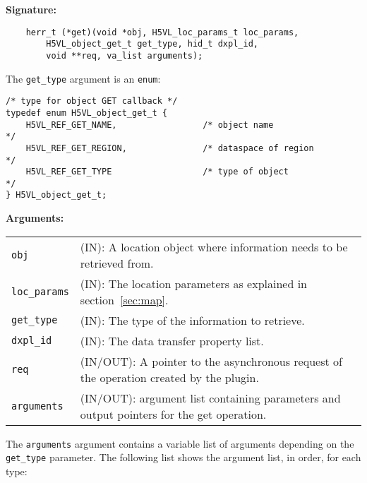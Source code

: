 \begin{mdframed}[style=bgbox]
\textbf{Signature:}
\begin{lstlisting}
    herr_t (*get)(void *obj, H5VL_loc_params_t loc_params, 
        H5VL_object_get_t get_type, hid_t dxpl_id, 
        void **req, va_list arguments);
\end{lstlisting}

The \texttt{get\_type} argument is an \texttt{enum}:
\begin{lstlisting}
/* type for object GET callback */
typedef enum H5VL_object_get_t {
    H5VL_REF_GET_NAME,                 /* object name                       */
    H5VL_REF_GET_REGION,               /* dataspace of region               */
    H5VL_REF_GET_TYPE                  /* type of object                    */
} H5VL_object_get_t;
\end{lstlisting}

\textbf{Arguments:}\\
\begin{tabular}{l p{10cm}}
  \texttt{obj} & (IN): A location object where information needs to be
  retrieved from.\\
  \texttt{loc\_params} & (IN): The location parameters as
  explained in section~\ref{sec:map}.\\
  \texttt{get\_type} & (IN): The type of the information to retrieve.\\
  \texttt{dxpl\_id} & (IN): The data transfer property list.\\
  \texttt{req} & (IN/OUT): A pointer to the asynchronous request of the
  operation created by the plugin.\\
  \texttt{arguments} & (IN/OUT): argument list containing parameters and
  output pointers for the get operation. \\
\end{tabular}
\end{mdframed}

The \texttt{arguments} argument contains a variable list of arguments
depending on the \texttt{get\_type} parameter. The following list shows
the argument list, in order, for each type:

